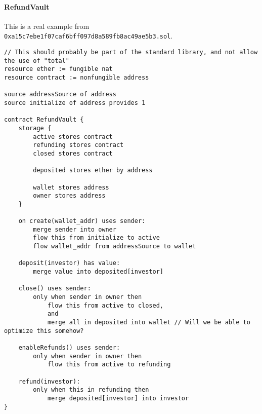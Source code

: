 \documentclass[10pt]{article}
\begin{document}
\paragraph{RefundVault}
This is a real example from \lstinline{0xa15c7ebe1f07caf6bff097d8a589fb8ac49ae5b3.sol}.

\begin{lstlisting}
// This should probably be part of the standard library, and not allow the use of "total"
resource ether := fungible nat
resource contract := nonfungible address

source addressSource of address
source initialize of address provides 1

contract RefundVault {
    storage {
        active stores contract
        refunding stores contract
        closed stores contract

        deposited stores ether by address

        wallet stores address
        owner stores address
    }

    on create(wallet_addr) uses sender:
        merge sender into owner
        flow this from initialize to active
        flow wallet_addr from addressSource to wallet

    deposit(investor) has value:
        merge value into deposited[investor]

    close() uses sender:
        only when sender in owner then
            flow this from active to closed,
            and
            merge all in deposited into wallet // Will we be able to optimize this somehow?

    enableRefunds() uses sender:
        only when sender in owner then
            flow this from active to refunding

    refund(investor):
        only when this in refunding then
            merge deposited[investor] into investor
}
\end{lstlisting}
\end{document}
